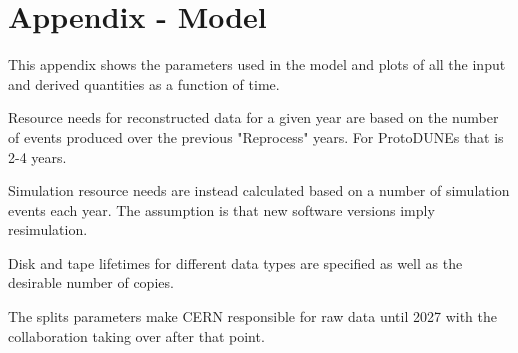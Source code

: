 \documentclass[12pt]{article}
\begin{document}
\section{Appendix - Model }

This appendix shows the parameters used in the model and plots of all the input and derived quantities as a function of time. 

Resource needs for reconstructed data for a given year are based on the number of events produced over the previous "Reprocess" years.   For ProtoDUNEs that is 2-4 years. 

Simulation resource needs are instead calculated based on a number of simulation events each year. The assumption is that new software versions imply resimulation.

Disk and tape lifetimes for different data types are specified as well as the desirable number of copies. 

The splits parameters make CERN responsible for raw data until 2027 with the collaboration taking over after that point. 


\end{document}
